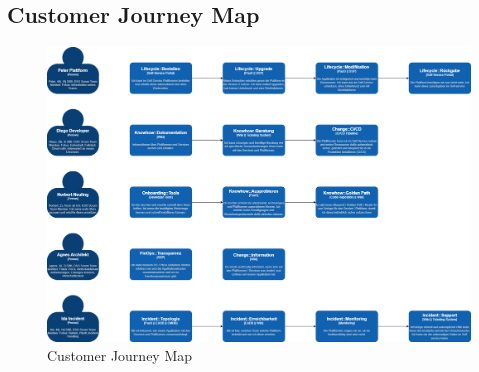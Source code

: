 \documentclass[a4paper,12pt]{article}
\begin{document}
    \subsection{Customer Journey Map}
    \label{subsec:cusjourmap}
    \begin{landscape}
        \begin{figure}[h]
            \includegraphics[origin=c,width=0.9\linewidth]{customer-journey.png}
            \caption{Customer Journey Map}
            \label{fig:customerjourney}
        \end{figure}
    \end{landscape}
\end{document}
